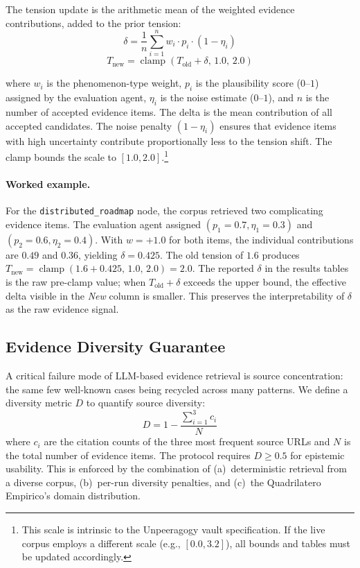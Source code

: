 \documentclass[10pt,twocolumn]{article}
\begin{document}
The tension update is the arithmetic mean of the weighted evidence contributions, added to the prior tension:
\begin{equation}
\label{eq:delta}
\delta = \frac{1}{n}\sum_{i=1}^{n} w_i \cdot p_i \cdot (1 - \eta_i)
\end{equation}
\begin{equation}
\label{eq:tnew}
T_{\text{new}} = \operatorname{clamp}(T_{\text{old}} + \delta,\, 1.0,\, 2.0)
\end{equation}

where $w_i$ is the phenomenon-type weight, $p_i$ is the plausibility score ($0$--$1$) assigned by the evaluation agent, $\eta_i$ is the noise estimate ($0$--$1$), and $n$ is the number of accepted evidence items. The delta is the mean contribution of all accepted candidates. The noise penalty $(1-\eta_i)$ ensures that evidence items with high uncertainty contribute proportionally less to the tension shift. The clamp bounds the scale to $[1.0, 2.0]$.\footnote{This scale is intrinsic to the Unpeeragogy vault specification. If the live corpus employs a different scale (e.g., $[0.0, 3.2]$), all bounds and tables must be updated accordingly.}

\paragraph{Worked example.} For the \texttt{distributed\_roadmap} node, the corpus retrieved two complicating evidence items. The evaluation agent assigned $(p_1=0.7, \eta_1=0.3)$ and $(p_2=0.6, \eta_2=0.4)$. With $w=+1.0$ for both items, the individual contributions are $0.49$ and $0.36$, yielding $\delta = 0.425$. The old tension of $1.6$ produces $T_{\text{new}} = \operatorname{clamp}(1.6 + 0.425,\, 1.0,\, 2.0) = 2.0$. The reported $\delta$ in the results tables is the raw pre-clamp value; when $T_{\text{old}} + \delta$ exceeds the upper bound, the effective delta visible in the \emph{New} column is smaller. This preserves the interpretability of $\delta$ as the raw evidence signal.

\subsection{Evidence Diversity Guarantee}
\label{subsec:diversity}

A critical failure mode of LLM-based evidence retrieval is source concentration: the same few well-known cases being recycled across many patterns. We define a diversity metric $D$ to quantify source diversity:
\begin{equation}
\label{eq:diversity}
D = 1 - \frac{\sum_{i=1}^{3} c_i}{N}
\end{equation}
where $c_i$ are the citation counts of the three most frequent source URLs and $N$ is the total number of evidence items. The protocol requires $D \geq 0.5$ for epistemic usability. This is enforced by the combination of (a)~deterministic retrieval from a diverse corpus, (b)~per-run diversity penalties, and (c)~the Quadrilatero Empirico's domain distribution.
\end{document}
